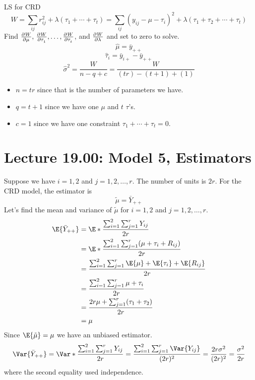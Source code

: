 \begin{Example}{LS for CRD}{}
      \[ W=\sum_{ij}r_{ij}^2+\lambda(\tau_1+\cdots+\tau_t)=
            \sum_{ij}(y_{ij}-\mu-\tau_i)^2+\lambda(\tau_1+\tau_2+\cdots+\tau_t)   \]
      Find $ \pd{W}{\mu},\, \pd{W}{\tau_1},\ldots,\pd{W}{\tau_t} $, and $ \pd{W}{\lambda} $
      and set to zero to solve.
      \[ \hat{\mu}=\bar{y}_{++} \]
      \[ \hat{\tau}_i=\bar{y}_{i+}-\bar{y}_{++} \]
      \[ \hat{\sigma}^2=\frac{W}{n-q+c}=\frac{W}{(tr)-(t+1)+(1)} \]
      \begin{itemize}
            \item $ n=tr $ since that is the number of parameters we have.
            \item $ q=t+1 $ since we have one $ \mu $ and $ t $ $ \tau $'s.
            \item $ c=1 $ since we have one constraint $ \tau_1+\cdots+\tau_t=0 $.
      \end{itemize}
\end{Example}
\section{Lecture 19.00: Model 5, Estimators}
Suppose we have $ i=1,2 $ and $ j=1,2,\ldots,r $.
The number of units is $ 2r $. For the CRD model, the estimator is
\[ \tilde{\mu}=\bar{Y}_{++} \]
Let's find the mean and variance of $ \tilde{\mu} $ for $ i=1,2 $ and
$ j=1,2,\ldots,r $.
\begin{align*}
      \E{\bar{Y}_{++}}
       & =\E*{\frac{\sum_{i=1}^{2} \sum_{j=1}^{r} Y_{ij}}{2r} }                  \\
       & =\E*{\frac{\sum_{i=1}^{2} \sum_{j=1}^{r} (\mu+\tau_i+R_{ij})}{2r} }     \\
       & =\frac{\sum_{i=1}^{2} \sum_{j=1}^{r} \E{\mu}+\E{\tau_i}+\E{R_{ij}}}{2r} \\
       & =\frac{\sum_{i=1}^{2} \sum_{j=1}^{r} \mu+\tau_i}{2r}                    \\
       & =\frac{2r\mu+\sum_{j=1}^{r} (\tau_1+\tau_2)}{2r}                        \\
       & =\mu
\end{align*}
Since $ \E{\tilde{\mu}}=\mu $ we have an unbiased estimator.
\[ \Var{\bar{Y}_{++}}
      =\Var*{\frac{\sum_{i=1}^{2} \sum_{j=1}^{r} Y_{ij}}{2r} }
      =\frac{\sum_{i=1}^{2} \sum_{j=1}^{r} \Var{Y_{ij}}}{(2r)^2}
      =\frac{2r\sigma^2}{(2r)^2}
      =\frac{\sigma^2}{2r}  \]
where the second equality used independence.

